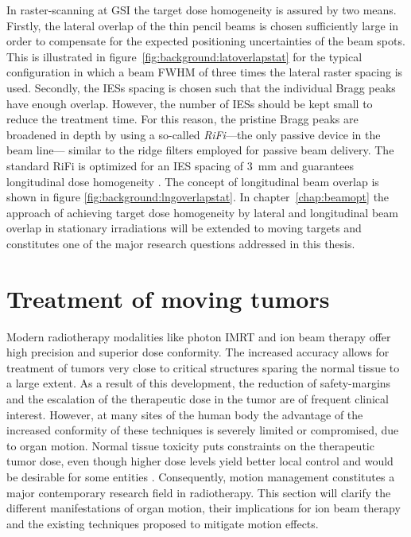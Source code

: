 In raster-scanning at \ac{GSI} the target dose homogeneity is assured
by two means. Firstly, the lateral overlap of the thin pencil beams is
chosen sufficiently large in order to compensate for the expected
positioning uncertainties of the beam spots. This is illustrated in
figure~\ref{fig:background:latoverlapstat} for the typical
configuration in which a beam \ac{FWHM} of three times the lateral
raster spacing is used. Secondly, the \aclp{IES} spacing is chosen
such that the individual Bragg peaks have enough overlap. However, the
number of \acp{IES} should be kept small to reduce the treatment
time. For this reason, the pristine Bragg peaks are broadened in depth
by using a so-called \emph{\acf{RiFi}}---the only passive device in the
beam line--- similar to the ridge filters employed for passive beam
delivery. The standard \ac{RiFi} is optimized for an \ac{IES} spacing
of \SI{3}{\milli\meter} and guarantees longitudinal dose homogeneity
\citep{Weber1999}. The concept of longitudinal beam overlap is shown
in figure \ref{fig:background:lngoverlapstat}.  In
chapter~\ref{chap:beamopt} the approach of achieving target dose
homogeneity by lateral and longitudinal beam overlap in stationary
irradiations will be extended to moving targets and constitutes one of
the major research questions addressed in this thesis.


\section{Treatment of moving tumors}
\label{sec:background:organmotion}
Modern radiotherapy modalities like photon \ac{IMRT} and ion beam
therapy offer high precision and superior dose conformity. The
increased accuracy allows for treatment of tumors very close to
critical structures sparing the normal tissue to a large extent. As a
result of this development, the reduction of safety-margins and the
escalation of the therapeutic dose in the tumor are of frequent
clinical interest. However, at many sites of the human body the
advantage of the increased conformity of these techniques is severely
limited or compromised, due to organ motion. Normal tissue toxicity
puts constraints on the therapeutic tumor dose, even though higher
dose levels yield better local control and would be desirable for some
entities \citep{Rengan2004,Rosenzweig2005,Kong2005}. Consequently,
motion management constitutes a major contemporary research field in
radiotherapy. This section will clarify the different manifestations
of organ motion, their implications for ion beam therapy and the
existing techniques proposed to mitigate motion effects.


